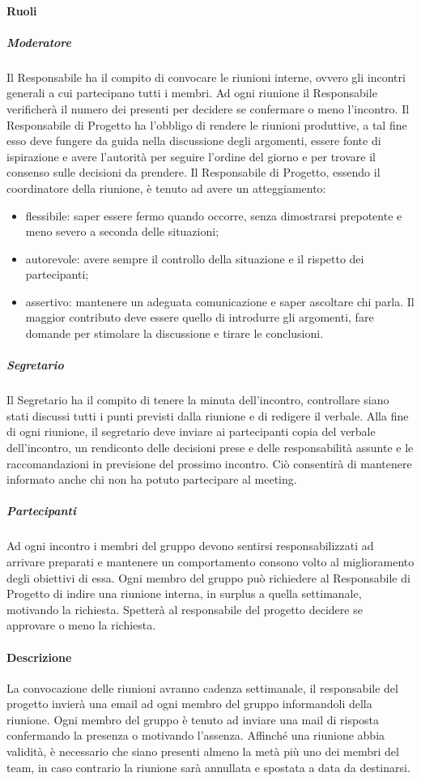 \paragraph{Ruoli}
\subparagraph{Moderatore}
Il Responsabile ha il compito di convocare le riunioni interne, ovvero gli incontri generali a cui partecipano tutti i membri.
Ad ogni riunione il Responsabile verificherà il numero dei presenti per decidere se confermare o meno l'incontro.
Il Responsabile di Progetto ha l'obbligo di rendere le riunioni produttive, a tal fine 
esso deve fungere da guida nella discussione degli argomenti, essere fonte di ispirazione e avere l'autorità per seguire l'ordine del giorno e per trovare il consenso sulle decisioni da prendere.
Il Responsabile di Progetto, essendo il coordinatore della riunione, è tenuto ad avere un atteggiamento:
\begin{itemize}
\item
flessibile: saper essere fermo quando occorre, senza dimostrarsi prepotente e meno severo a seconda delle situazioni;
\item
autorevole: avere sempre il controllo della situazione e il rispetto dei partecipanti;
\item
assertivo: mantenere un adeguata comunicazione e saper ascoltare chi parla. Il maggior contributo deve essere quello di introdurre gli argomenti, fare domande per stimolare la discussione e tirare le conclusioni.
\end{itemize}
\subparagraph{Segretario}
Il Segretario ha il compito di tenere la minuta dell'incontro, controllare siano stati discussi tutti i punti previsti dalla riunione e di redigere
il verbale. Alla fine di ogni riunione, il segretario deve inviare ai partecipanti copia del verbale dell'incontro, un rendiconto delle decisioni prese e delle responsabilità assunte e le raccomandazioni in previsione del prossimo incontro. Ciò consentirà di mantenere informato anche chi non ha potuto partecipare al meeting. 
\subparagraph{Partecipanti}
Ad ogni incontro i membri del gruppo devono sentirsi responsabilizzati ad arrivare preparati e mantenere un comportamento consono volto al miglioramento degli obiettivi di essa.
Ogni membro del gruppo può richiedere al Responsabile di Progetto di indire una riunione interna, in surplus a quella settimanale, motivando la richiesta. Spetterà al responsabile del progetto decidere se approvare o meno la richiesta.
\paragraph{Descrizione}
La convocazione delle riunioni avranno cadenza settimanale, il responsabile del progetto invierà una email ad ogni membro del gruppo informandoli della riunione.
Ogni membro del gruppo è tenuto ad inviare una mail di risposta confermando la presenza o motivando l'assenza.
Affinché una riunione abbia validità, è necessario che siano presenti almeno la metà più uno dei membri del team, in caso contrario la riunione sarà annullata e spostata a data da destinarsi.

